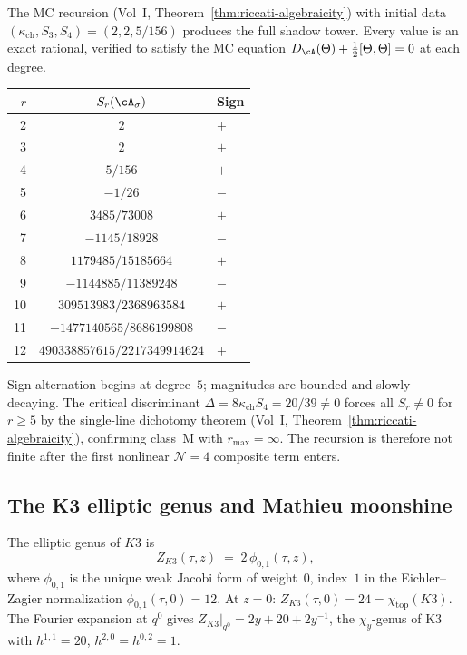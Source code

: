 \begin{computation}
\label{comp:shadow-tower-k3}
The MC recursion (Vol~I, Theorem~\textup{\ref{thm:riccati-algebraicity}})
with initial data $(\kappa_{\mathrm{ch}}, S_3, S_4) = (2, 2, 5/156)$ produces the
full shadow tower. Every value is an exact rational, verified to
satisfy the MC equation
$D_{\cA}(\Theta) + \tfrac{1}{2}[\Theta, \Theta] = 0$
at each degree.
\begin{center}
\renewcommand{\arraystretch}{1.2}
\begin{tabular}{rcl}
 \toprule
 $r$ & $S_r(\cA_\sigma)$ & Sign \\
 \midrule
 2 & $2$ & $+$ \\
 3 & $2$ & $+$ \\
 4 & $5/156$ & $+$ \\
 5 & $-1/26$ & $-$ \\
 6 & $3485/73008$ & $+$ \\
 7 & $-1145/18928$ & $-$ \\
 8 & $1179485/15185664$ & $+$ \\
 9 & $-1144885/11389248$ & $-$ \\
 10 & $309513983/2368963584$ & $+$ \\
 11 & $-1477140565/8686199808$ & $-$ \\
 12 & $490338857615/2217349914624$ & $+$ \\
 \bottomrule
\end{tabular}
\end{center}
Sign alternation begins at degree~$5$; magnitudes are bounded and
slowly decaying. The critical discriminant
$\Delta = 8\kappa_{\mathrm{ch}} S_4 = 20/39 \neq 0$ forces all $S_r \neq 0$ for
$r \geq 5$ by the single-line dichotomy theorem
(Vol~I, Theorem~\textup{\ref{thm:riccati-algebraicity}}),
confirming class~M with $r_{\max} = \infty$.
The recursion is therefore not finite after the first nonlinear
\(\mathcal N=4\) composite term enters.
\end{computation}

\subsection{The K3 elliptic genus and Mathieu moonshine}
\label{subsec:k3-elliptic-genus}

\begin{definition}
\label{def:k3-elliptic-genus}
The elliptic genus of $K3$ is
\begin{equation}\label{eq:k3-elliptic-genus}
Z_{K3}(\tau,z) \;=\; 2\,\phi_{0,1}(\tau,z),
\end{equation}
where $\phi_{0,1}$ is the unique weak Jacobi form of weight~$0$,
index~$1$ in the Eichler--Zagier normalization
$\phi_{0,1}(\tau,0) = 12$. At $z = 0$:
$Z_{K3}(\tau,0) = 24 = \chi_{\mathrm{top}}(K3)$.
The Fourier expansion at $q^0$ gives
$Z_{K3}|_{q^0} = 2y + 20 + 2y^{-1}$,
the $\chi_y$-genus of K3 with $h^{1,1} = 20$,
$h^{2,0} = h^{0,2} = 1$.
\end{definition}

